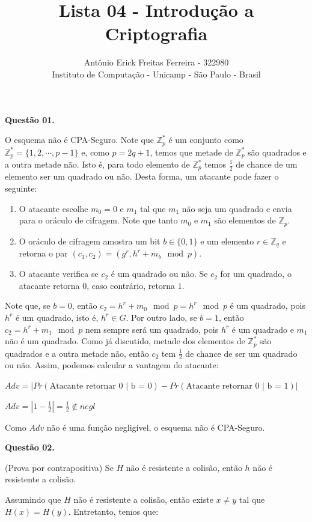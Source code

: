 \documentclass{article}
\title{Lista 04 - Introdução a Criptografia}
\author{Antônio Erick Freitas Ferreira - 322980\\
        \small Instituto de Computação - Unicamp - São Paulo - Brasil
}
\begin{document}
\maketitle

\textbf{Questão 01.}

O esquema não é CPA-Seguro. Note que $\mathbb{Z}_p^*$ é um conjunto como $\mathbb{Z}_p^* = \{1,2, \cdots, p-1\}$ e, como $p = 2q + 1$, temos que metade de $\mathbb{Z}_p^*$ são quadrados e a outra metade não. Isto é, para todo elemento de $\mathbb{Z}_p^*$ temos $\frac{1}{2}$ de chance de um elemento ser um quadrado ou não. Desta forma, um atacante pode fazer o seguinte:

\begin{enumerate}
        \item O atacante escolhe $m_0 = 0$ e $m_1$ tal que $m_1$ não seja um quadrado e envia para o oráculo de cifragem. Note que tanto $m_0$ e $m_1$ são elementos de $\mathbb{Z}_p$. 
        \item O oráculo de cifragem amostra um bit $b \in \{0,1\}$ e um elemento $r \in \mathbb{Z}_q$ e retorna o par $(c_1, c_2) = (g^r,h^r + m_b \mod p)$.
        \item O atacante verifica se $c_2$ é um quadrado ou não. Se $c_2$ for um quadrado, o atacante retorna $0$, caso contrário, retorna $1$.
\end{enumerate}

Note que, se $b = 0$, então $c_2 = h^r + m_0 \mod p = h^r \mod p$ é um quadrado, pois $h^r$ é um quadrado, isto é, $h^r \in G$. Por outro lado, se $b = 1$, então $c_2 = h^r + m_1 \mod p$ nem sempre será um quadrado, pois $h^r$ é um quadrado e $m_1$ não é um quadrado. Como já discutido, metade dos elementos de $\mathbb{Z}_p^*$ são quadrados e a outra metade não, então $c_2$ tem $\frac{1}{2}$ de chance de ser um quadrado ou não. Assim, podemos calcular a vantagem do atacante:

$Adv = | Pr(\text{Atacante retornar 0 | b = 0}) - Pr(\text{Atacante retornar 0 | b = 1})|$

$Adv = |1 - \frac{1}{2}| = \frac{1}{2} \notin negl$

Como $Adv$ não é uma função negligível, o esquema não é CPA-Seguro.

\textbf{Questão 02.}

(Prova por contrapositiva) Se $H$ não é resistente a colisão, então $h$ não é resistente a colisão.

Assumindo que $H$ não é resistente a colisão, então existe $x \neq y$ tal que $H(x) = H(y)$. Entretanto, temos que:
\end{document}
